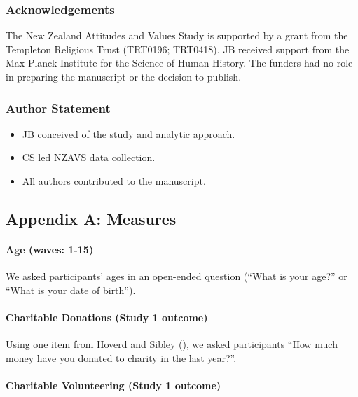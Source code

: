 \documentclass[
  singlecolumn]{article}
\let\oldparagraph\paragraph
\renewcommand{\paragraph}[1]{\oldparagraph{#1}\mbox{}}
\providecommand{\tightlist}{%
  \setlength{\itemsep}{0pt}\setlength{\parskip}{0pt}}\usepackage{longtable,booktabs,array}
\begin{document}
\subsubsection{Acknowledgements}\label{acknowledgements}

The New Zealand Attitudes and Values Study is supported by a grant from
the Templeton Religious Trust (TRT0196; TRT0418). JB received support
from the Max Planck Institute for the Science of Human History. The
funders had no role in preparing the manuscript or the decision to
publish.

\subsubsection{Author Statement}\label{author-statement}

\begin{itemize}
\tightlist
\item
  JB conceived of the study and analytic approach.\\
\item
  CS led NZAVS data collection.
\item
  All authors contributed to the manuscript.
\end{itemize}

\newpage{}

\subsection{Appendix A: Measures}\label{appendix-measures}

\paragraph{Age (waves: 1-15)}\label{age-waves-1-15}

We asked participants' ages in an open-ended question (``What is your
age?'' or ``What is your date of birth'').

\paragraph{Charitable Donations (Study 1
outcome)}\label{charitable-donations-study-1-outcome}

Using one item from Hoverd and Sibley
(), we asked participants
``How much money have you donated to charity in the last year?''.

\paragraph{Charitable Volunteering (Study 1
outcome)}\label{charitable-volunteering-study-1-outcome}
\end{document}
